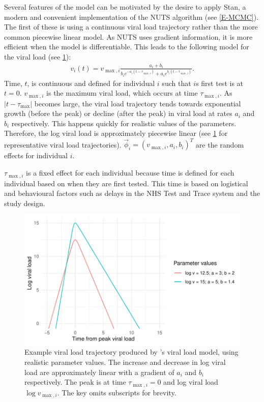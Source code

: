 \documentclass[thesis.tex]{subfiles}
\begin{document}
Several features of the \textcite{hakkiOnset} model can be motivated by the desire to apply Stan, a modern and convenient implementation of the NUTS algorithm (see \cref{E-MCMC}).
The first of these is using a continuous viral load trajectory rather than the more common piecewise linear model.
As NUTS uses gradient information, it is more efficient when the model is differentiable.
This leads to the following model for the viral load (see \cref{ATACCC:fig:viral-load-model}):
\begin{align}
v_i(t) = v_{\max,i} \frac{a_i+b_i}{b_ie^{-a_i(t-\tau_{\max,i})} + a_ie^{b_i(t-\tau_{\max,i})}}. \label{ATACCC:eq:viral-load}
\end{align}
Time, $t$, is continuous and defined for individual $i$ such that $i$s first test is at $t = 0$.
$v_{\max,i}$ is the maximum viral load, which occurs at time $\tau_{\max,i}$.
As $\lvert t - \tau_{\max} \rvert$ becomes large, the viral load trajectory tends towards exponential growth (before the peak) or decline (after the peak) in viral load at rates $a_i$ and $b_i$ respectively.
This happens quickly for realistic values of the parameters.
Therefore, the log viral load is approximately piecewise linear (see \cref{ATACCC:fig:viral-load-model} for representative viral load trajectories).
$\vec{\phi}_i = (v_{\max,i}, a_i, b_i)^T$ are the random effects for individual $i$.

$\tau_{\max,i}$ is a fixed effect for each individual because time is defined for each individual based on when they are first tested.
This time is based on logistical and behavioural factors such as delays in the NHS Test and Trace system and the study design.
\begin{figure}[tbhp]
  \centering \includegraphics{ATACCC/typical_trajectory}
  \caption[Example viral load model trajectory.]{%
    Example viral load trajectory produced by \textcite{hakkiOnset}'s viral load model, using realistic parameter values.
    The increase and decrease in log viral load are approximately linear with a gradient of $a_i$ and $b_i$ respectively.
    The peak is at time $\tau_{\max,i} = 0$ and log viral load $\log v_{\max,i}$.
    The key omits subscripts for brevity.
  }
  \label{ATACCC:fig:viral-load-model}
\end{figure}
\end{document}
